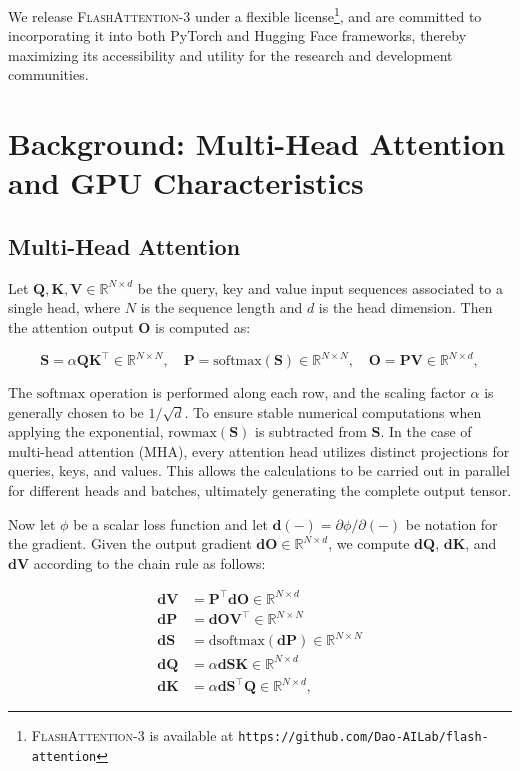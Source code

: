 We release \textsc{FlashAttention-3} under a flexible license\footnote{\textsc{FlashAttention-3}
  is available at \texttt{https://github.com/Dao-AILab/flash-attention}}, and are committed to incorporating it into both PyTorch and Hugging Face frameworks, thereby maximizing its accessibility and utility for the research and development communities.

\section{Background: Multi-Head Attention and GPU Characteristics}
\label{sec:background}

\subsection{Multi-Head Attention}
\label{subsec:multi_head_attn}

Let $\mathbf{Q}, \mathbf{K}, \mathbf{V} \in \mathbb{R}^{N \times d}$ be the query, key and value input sequences associated to a single head, where $N$ is the sequence length and $d$ is the head dimension. Then the attention output $\mathbf{O}$ is computed as:

\begin{equation*}
  \mathbf{S} = \alpha \mathbf{Q} \mathbf{K}^\top \in \mathbb{R}^{N \times N}, \quad \mathbf{P} = \mathrm{softmax}(\mathbf{S}) \in \mathbb{R}^{N \times N}, \quad \mathbf{O} = \mathbf{P}\mathbf{V} \in \mathbb{R}^{N \times d},
\end{equation*}

The $\mathrm{softmax}$ operation is performed along each row, and the scaling factor $\alpha$ is generally chosen to be $1/\sqrt{d}$. To ensure stable numerical computations when applying the exponential, $\mathrm{rowmax}(\mathbf{S})$ is subtracted from $\mathbf{S}$. In the case of multi-head attention (MHA), every attention head utilizes distinct projections for queries, keys, and values. This allows the calculations to be carried out in parallel for different heads and batches, ultimately generating the complete output tensor.

Now let $\phi$ be a scalar loss function and let $\mathbf{d}(-) = \partial \phi / \partial (-)$ be notation for the gradient. Given the output gradient $\mathbf{dO} \in \mathbb{R}^{N \times d}$, we compute $\mathbf{dQ}$, $\mathbf{dK}$, and $\mathbf{dV}$ according to the chain rule as follows:

\begin{align*}
  \mathbf{dV} &= \mathbf{P}^\top \mathbf{dO} \in \mathbb{R}^{N \times d} \\
  \mathbf{dP} &= \mathbf{dO} \mathbf{V}^\top \in \mathbb{R}^{N \times N} \\
  \mathbf{dS} &= \mathrm{dsoftmax} (\mathbf{dP}) \in \mathbb{R}^{N \times N} \\
  \mathbf{dQ} &= \alpha \mathbf{dS} \mathbf{K} \in \mathbb{R}^{N \times d} \\
  \mathbf{dK} &= \alpha \mathbf{dS}^\top \mathbf{Q} \in \mathbb{R}^{N \times d},
\end{align*}

